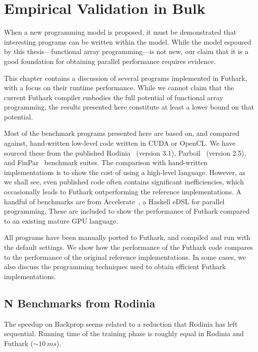 \chapter{Empirical Validation in Bulk}
\label{chap:empirical-validation}

When a new programming model is proposed, it must be demonstrated that
interesting programs can be written within the model.  While the model
espoused by this thesis---functional array programming---is not new,
our claim that it is a good foundation for obtaining parallel
performance requires evidence.

This chapter contains a discussion of several programs implemented in
Futhark, with a focus on their runtime performance.  While we cannot
claim that the current Futhark compiler embodies the full potential of
functional array programming, the results presented here constitute at
least a lower bound on that potential.

Most of the benchmark programs presented here are based on, and
compared against, hand-written low-level code written in CUDA or
OpenCL.  We have sourced these from the published
Rodinia~\cite{5306797} (version 3.1),
Parboil~\cite{stratton2012parboil} (version 2.5), and
FinPar~\cite{FinPar:TACO} benchmark suites.  The comparison with
hand-written implementations is to show the cost of using a high-level
language.  However, as we shall see, even published code often
contains significant inefficiencies, which occasionally leads to
Futhark outperforming the reference implementations.  A handful of
benchmarks are from Accelerate~\cite{mcdonell2013optimising}, a
Haskell eDSL for parallel programming.  These are included to show the
performance of Futhark compared to an existing mature GPU language.

All programs have been manually ported to Futhark, and compiled and
run with the default settings.  We show how the performance of the
Futhark code compares to the performance of the original reference
implementations.  In some cases, we also discuss the programming
techniques used to obtain efficient Futhark implementations.

\section{N Benchmarks from Rodinia}
\label{sec:rodinia}

The speedup on Backprop seems related to a reduction that Rodinia has
left sequential.  Running time of the training phase is roughly equal
in Rodinia and Futhark ($\sim10~ms$).

